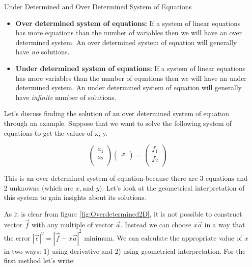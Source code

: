 \begin{defbox}{Under Determined and Over Determined System of Equations}
	\begin{itemize}
		\item \textbf{Over determined system of equations:} If a system of linear equations has more equations than the number of variables then we will have an over determined system. An over determined system of equation will generally have \emph{no} solutions.
		
		\item \textbf{Under determined system of equations:} If a system of linear equations has more variables than the number of equations then we will have an under determined system. An under determined system of equation will generally have \emph{infinite} number of solutions.
	\end{itemize}

\end{defbox}


Let's discuss finding the solution of an over determined system of equation through an example. Suppose that we want to solve the following system of equations to get the values of x, y.

\begin{equation*}
	\begin{pmatrix}
		a_1  \\
		a_2  \\

	\end{pmatrix} 
	\begin{pmatrix}
		x \\
	\end{pmatrix}
	= \begin{pmatrix}
		f_1 \\
		f_2 \\
	\end{pmatrix}
\end{equation*}

This is an over determined system of equation because there are 3 equations and 2 unknowns (which are $x, \text{and } y$). Let's look at the geometrical interpretation of this system to gain insights about its solutions. 



As it is clear from figure \ref{fig:Overdetermined2D}, it is not possible to construct vector $\overrightarrow{f}$ with any multiple of vector $\overrightarrow{a}$. Instead we can choose $x \overrightarrow{a}$ in a way that the error $|\overrightarrow{\epsilon}|^2 = |\overrightarrow{f} - x \overrightarrow{a}|^2$ minimum. We can calculate the appropriate value of $x$ in two ways: 1) using derivative and 2) using geometrical interpretation. For the first method let's write:

